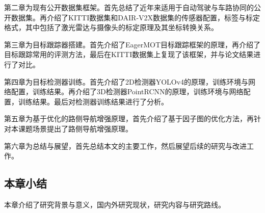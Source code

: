 第二章为现有公开数据集框架。首先总结了近年来适用于自动驾驶与车路协同的公开数据集。再介绍了KITTI数据集和DAIR-V2X数据集的传感器配置，标签与标定格式，其中包括了激光雷达与摄像头的标定原理及其坐标转换关系。

第三章为目标跟踪器搭建。首先介绍了EagerMOT目标跟踪框架的原理，再介绍了目标跟踪常用的评测方法，最后在KITTI数据集上复现了该框架，并与论文结果进行了对比。

第四章为目标检测器训练。首先介绍了2D检测器YOLOv4的原理，训练环境与网络配置，训练结果。再介绍了3D检测器PointRCNN的原理，训练环境与网络配置，训练结果。最后对检测器训练结果进行了分析。

第五章为基于优化的路侧导航增强原理，首先介绍了基于因子图的优化方法，再针对本课题场景提出了路侧导航增强原理。

第六章为总结与展望，首先总结本文的主要工作，然后展望后续的研究与改进工作。

\subsection{本章小结}



本章介绍了研究背景与意义，国内外研究现状，研究内容与研究路线。